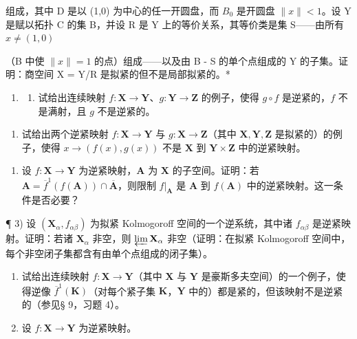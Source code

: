 组成，其中 D 是以 (1,0) 为中心的任一开圆盘，而 \(B_{0}\) 是开圆盘 \(\|x\|<1\)。设 Y 是赋以拓扑 C 的集 B，并设 R 是 Y 上的等价关系，其等价类是集 S——由所有 \(x\neq(1,0)\)

（B 中使 \(\|x\| = 1\) 的点）组成——以及由 B - S 的单个点组成的 Y 的子集。证明：商空间 X = Y/R 是拟紧的但不是局部拟紧的。*

\BourbakiExerciseGroup

\begin{enumerate}
\def\labelenumi{\arabic{enumi})}
\tightlist
\item
  \begin{enumerate}
  \def\labelenumii{\alph{enumii})}
  \tightlist
  \item
    试给出连续映射 \(f: \mathbf{X} \to \mathbf{Y}\)、\(g: \mathbf{Y} \to \mathbf{Z}\) 的例子，使得 \(g \circ f\) 是逆紧的，\(f\) 不是满射，且 \(g\) 不是逆紧的。
  \end{enumerate}
\end{enumerate}

\begin{enumerate}
\def\labelenumi{\alph{enumi})}
\setcounter{enumi}{1}
\tightlist
\item
  试给出两个逆紧映射 \(f: \mathbf{X} \to \mathbf{Y}\) 与 \(g: \mathbf{X} \to \mathbf{Z}\)（其中 \(\mathbf{X}, \mathbf{Y}, \mathbf{Z}\) 是拟紧的）的例子，使得 \(x \to (f(x), g(x))\) 不是 \(\mathbf{X}\) 到 \(\mathbf{Y} \times \mathbf{Z}\) 中的逆紧映射。
\end{enumerate}

\begin{enumerate}
\def\labelenumi{\arabic{enumi})}
\setcounter{enumi}{1}
\tightlist
\item
  设 \(f: \mathbf{X} \to \mathbf{Y}\) 为逆紧映射，\(\mathbf{A}\) 为 \(\mathbf{X}\) 的子空间。证明：若 \(\mathbf{A} = \overline{f}^1(f(\mathbf{A})) \cap \overline{\mathbf{A}}\)，则限制 \(f|_{\mathbf{A}}\) 是 \(\mathbf{A}\) 到 \(f(\mathbf{A})\) 中的逆紧映射。这一条件是否必要？
\end{enumerate}

¶ 3) 设 \((\mathbf{X}_{\alpha}, f_{\alpha\beta})\) 为拟紧 Kolmogoroff 空间的一个逆系统，其中诸 \(f_{\alpha\beta}\) 是逆紧映射。证明：若诸 \(\mathbf{X}_{\alpha}\) 非空，则 \(\varprojlim \mathbf{X}_{\alpha}\) 非空（证明：在拟紧 Kolmogoroff 空间中，每个非空闭子集都含有由单个点组成的闭子集）。

\begin{enumerate}
\def\labelenumi{\arabic{enumi})}
\setcounter{enumi}{3}
\item
  试给出连续映射 \(f: \mathbf{X} \to \mathbf{Y}\)（其中 \(\mathbf{X}\) 与 \(\mathbf{Y}\) 是豪斯多夫空间）的一个例子，使得逆像 \(\overline{f}^1(\mathbf{K})\)（对每个紧子集 \(\mathbf{K}\)，\(\mathbf{Y}\) 中的）都是紧的，但该映射不是逆紧的（参见§ 9，习题 4）。
\item
  设 \(f: \mathbf{X} \to \mathbf{Y}\) 为逆紧映射。
\end{enumerate}

